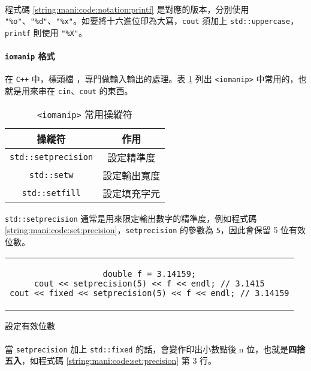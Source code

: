 \documentclass[12pt,a4paper,oneside]{article}
\begin{document}
\begin{CJK}{UTF8}{bkai}
\paragraph{}程式碼 \ref{string:mani:code:notation:printf} 是對應的版本，分別使用 \lstinline!"%o"!、\lstinline!"%d"!、\lstinline!"%x"!。如要將十六進位印為大寫，\lstinline!cout! 須加上 \lstinline!std::uppercase!，\lstinline!printf! 則使用 \lstinline!"%X"!。
\paragraph{\texttt{iomanip} 格式}在 \texttt{C++} 中，標頭檔 ，專門做輸入輸出的處理。表 \ref{string:mani:table:iomanip} 列出 \lstinline!<iomanip>!
中常用的，也就是用來串在 \lstinline!cin!、\lstinline!cout! 的東西。

\begin{table}[h!]
  \centering
  \begin{tabular}{|c|c|}
  \hline
  \textbf{操縱符} & \textbf{作用}\\
  \hline\hline
  \lstinline!std::setprecision! & 設定精準度\\
  \hline
  \lstinline!std::setw! & 設定輸出寬度\\
  \hline
  \lstinline!std::setfill! & 設定填充字元\\
  \hline
  \end{tabular}
  \caption{\lstinline!<iomanip>! 常用操縱符}
  \label{string:mani:table:iomanip}
\end{table}

\lstinline!std::setprecision! 通常是用來限定輸出數字的精準度，例如程式碼 \ref{string:mani:code:set:precision}，\lstinline!setprecision! 的參數為 \lstinline!5!，因此會保留 5 位有效位數。

\begin{code}[h!]
  \centering
  \begin{tabular}{c}
  \begin{lstlisting}
double f = 3.14159;
cout << setprecision(5) << f << endl; // 3.1415
cout << fixed << setprecision(5) << f << endl; // 3.14159
  \end{lstlisting}
  \end{tabular}
  \caption{設定有效位數}
  \label{string:mani:code:set:precision}
\end{code}

\paragraph{}當 \lstinline!setprecision! 加上 \lstinline!std::fixed! 的話，會變作印出小數點後 n 位，也就是\textbf{四捨五入}，如程式碼 \ref{string:mani:code:set:precision} 第 3 行。

\end{CJK}
\end{document}

